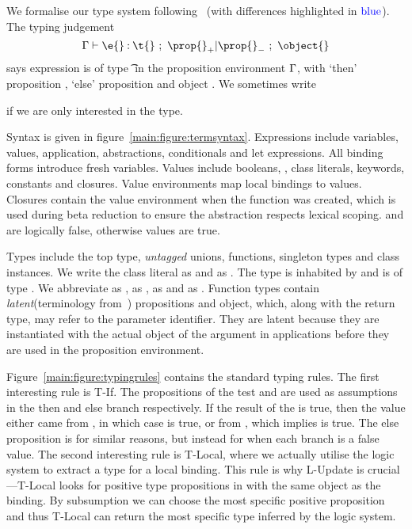 We formalise our type system following~\citet{TF10}
(with differences highlighted in $\mathbin{\textcolor{blue}{\text{blue}}}$).
The typing judgement 
$$
{\judgement   {\propenv}
              {\hastype {\e{}} {\t{}}}
  {\filterset {\thenprop {\prop{}}}
              {\elseprop {\prop{}}}}
  {\object{}}}
$$
says expression \e{} is of type \t{} in the 
proposition environment $\Gamma{}$, with 
`then' proposition {\thenprop {\prop{}}}, `else' proposition {\elseprop {\prop{}}}
and object \object{}. We sometimes write 
{\judgementtwo{\propenv}{\hastype {\e{}} {\t{}}} if we are only interested in the type.

Syntax is given in figure~\ref{main:figure:termsyntax}. Expressions include variables, values,
application, abstractions, conditionals and let expressions.
All binding forms introduce fresh variables.
Values include booleans, \nil{}, class literals, keywords, 
constants and closures. 
Value environments map local bindings to values.
Closures contain the value environment \openv{} when the function was created,
which is used during beta reduction to ensure the abstraction respects lexical scoping.
\false{} and \nil{} are logically false, otherwise values are true.

Types include the top type, \emph{untagged} unions, functions, singleton types
and class instances. 
We write the class literal  as \Boolean{} and  as \Keyword{}.
The type \Value{\Keyword} is inhabited by  and  is of type \Keyword{}.
We abbreviate \EmptyUnion{} as \Bot{}, {\ValueNil} as \Nil{}, 
{\ValueTrue} as \True and {\ValueFalse} as {\False}.
Function types contain \emph{latent}(terminology from~\cite{Lucassen88polymorphiceffect}) propositions and object, which, along with the return type,
may refer to the parameter identifier. They are latent because they are instantiated with the
actual object of the argument in applications before they are used in the proposition environment.

Figure~\ref{main:figure:typingrules} contains the standard typing rules.
The first interesting rule is T-If. The propositions of the test  and 
are used as assumptions in the then and else branch respectively.
If the result of the \ifliteral{} is true, then the value either
came from , in which case  is true, or from ,
which implies  is true. 
The else proposition is  for
similar reasons, but instead for when each branch is a false value.
The second interesting rule is T-Local, where we actually utilise the logic system
to extract a type for a local binding. This rule is why L-Update is crucial---T-Local
looks for positive type propositions in \propenv{} with the same object as the binding.
By subsumption we can choose the most specific positive proposition and thus
T-Local can return the most specific type inferred by the logic system.

}
